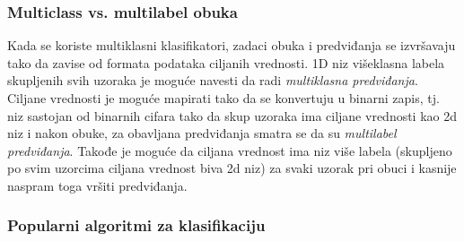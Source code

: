 \documentclass[fontsize=12bp, paper=a4]{scrarticle}
\begin{document}
\subsubsection{Multiclass vs. multilabel obuka}
Kada se koriste multiklasni klasifikatori, zadaci obuka i predviđanja se izvršavaju tako da zavise od formata podataka ciljanih vrednosti. 1D niz višeklasna labela skupljenih svih uzoraka je moguće navesti da radi \textit{multiklasna predviđanja}. Ciljane vrednosti je moguće mapirati tako da se konvertuju u binarni zapis, tj. niz sastojan od binarnih cifara tako da skup uzoraka ima ciljane vrednosti kao 2d niz i nakon obuke, za obavljana predviđanja smatra se da su \textit{multilabel predviđanja}. Takođe je moguće da ciljana vrednost ima niz više labela (skupljeno po svim uzorcima ciljana vrednost biva 2d niz) za svaki uzorak pri obuci i kasnije naspram toga vršiti predviđanja.


\subsubsection{Popularni algoritmi za klasifikaciju\cite{algs}}
\justifying
\end{document}
